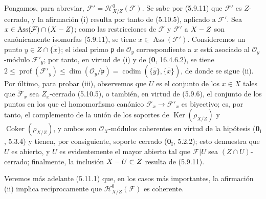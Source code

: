 Pongamos, para abreviar, $\mathcal F'=\mathcal H^0_{X/Z}(\mathcal F)$. Se sabe
por (5.9.11) que $\mathcal F'$ es $Z$-cerrado, y la afirmación (i) resulta por
tanto de (5.10.5), aplicado a $\mathcal F'$. Sea
$x\in\operatorname{Ass}(\mathcal F)\cap(X- Z)$; como las restricciones de
$\mathcal F$ y $\mathcal F'$ a $X- Z$ son canónicamente isomorfas (5.9.11),
se tiene $x\in\operatorname{Ass}(\mathcal F')$. Consideremos un punto
$y\in Z\cap\overline{\{x\}}$; el ideal primo $\mathfrak p$ de
$\mathcal O_y$ correspondiente a $x$ está asociado al $\mathcal O_y$-módulo
$\mathcal F'_y$; por tanto, en virtud de (i) y de (\textbf 0, 16.4.6.2), se tiene
$2\leq\operatorname{prof}(\mathcal F'_y)
\leq\dim(\mathcal O_y/\mathfrak p)
=\operatorname{codim}(\overline{\{y\}},\overline{\{x\}})$,
de donde se sigue (ii). Por último, para probar (iii), observemos que $U$ es
el conjunto de los $x\in X$ tales que $\widetilde{\mathcal F}_x$ sea
$Z_x$-cerrado (5.10.5), o también, en virtud de (5.9.6), el conjunto de los
puntos en los que el homomorfismo canónico
$\mathcal F_x\to\mathcal F'_x$ es biyectivo; es, por tanto, el complemento de
la unión de los soportes de $\operatorname{Ker}(\rho_{X/Z})$ y
$\operatorname{Coker}(\rho_{X/Z})$, y ambos son
$\mathcal O_X$-módulos coherentes en virtud de la hipótesis (\textbf 0$_\mathrm I$,
5.3.4) y tienen, por consiguiente, soporte cerrado (\textbf 0$_\mathrm I$, 5.2.2);
esto demuestra que $U$ es abierto, y $U$ es evidentemente el mayor abierto tal
que $\mathcal F|U$ sea $(Z\cap U)$-cerrado; finalmente, la inclusión
$X- U\subset Z$ resulta de (5.9.11).

Veremos más adelante (5.11.1) que, en los casos más importantes, la
afirmación (ii) implica recíprocamente que
$\mathcal H^0_{X/Z}(\mathcal F)$ es coherente.
